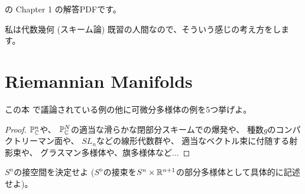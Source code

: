 \documentclass[uplatex,dvipdfmx]{jsarticle}
\begin{document}

\cite{jost2017riemannian}の Chapter 1 の解答PDFです。

私は代数幾何 (スキーム論) 既習の人間なので、そういう感じの考え方をします。

\fi

\section{Riemannian Manifolds}
\label{chapter1}




\begin{prob}\label{1.1}
  この本 \cite{jost2017riemannian} で議論されている例の他に可微分多様体の例を5つ挙げよ。
\end{prob}

\begin{proof}
  \(\mathbb{P}^n_{\mathbb{C}}\)や、
  \(\mathbb{P}^N_{\mathbb{C}}\)の適当な滑らかな閉部分スキームでの爆発や、
  種数\(g\)のコンパクトリーマン面や、
  \(SL_n\)などの線形代数群や、
  適当なベクトル束に付随する射影束や、
  グラスマン多様体や、旗多様体など...
\end{proof}










\begin{prob}\label{1.2}
  \(S^n\)の接空間を決定せよ
  (\(S^n\)の接束を\(S^n\times \mathbb{R}^{n+1}\)の部分多様体として具体的に記述せよ)。
\end{prob}
\end{document}
